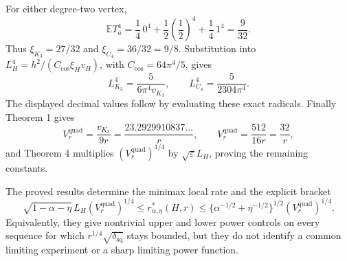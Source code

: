 For either degree-two vertex,
\[
\mathbb ET_a^4=\frac14\,0^4+\frac12\left(\frac12\right)^4+\frac14\,1^4=\frac9{32}.
\]
Thus \(\xi_{K_3}=27/32\) and \(\xi_{C_4}=36/32=9/8\).  Substitution into \(L_H^4=h^2/(C_{\cos}\xi_Hv_H)\), with \(C_{\cos}=64\pi^4/5\), gives
\[
L_{K_3}^4=\frac5{6\pi^4v_{K_3}},
\qquad L_{C_4}^4=\frac5{2304\pi^4}.
\]
The displayed decimal values follow by evaluating these exact radicals.  Finally Theorem 1 gives
\[
V_r^{\mathrm{quad}}=\frac{v_{K_3}}{9r}
=\frac{23.2929910837\ldots}{r},
\qquad
V_r^{\mathrm{quad}}=\frac{512}{16r}=\frac{32}{r},
\]
and Theorem 4 multiplies \((V_r^{\mathrm{quad}})^{1/4}\) by \(\sqrt\varepsilon L_H\), proving the remaining constants.

The proved results determine the minimax local rate and the explicit bracket
\[
\sqrt{1-\alpha-\eta}\,L_H(V_r^{\mathrm{quad}})^{1/4}
\le r^*_{\alpha,\eta}(H,r)
\le\{\alpha^{-1/2}+\eta^{-1/2}\}^{1/2}(V_r^{\mathrm{quad}})^{1/4}.
\]
Equivalently, they give nontrivial upper and lower power controls on every sequence for which \(r^{1/4}\sqrt{\delta_{\mathrm{sq}}}\) stays bounded, but they do not identify a common limiting experiment or a sharp limiting power function.

